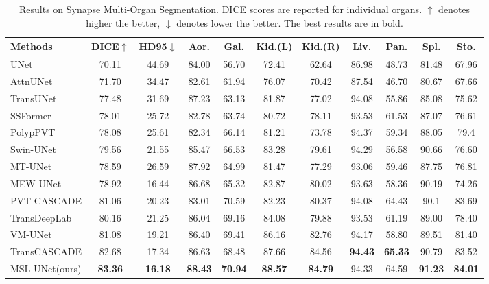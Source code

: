 \documentclass[10pt, a4paper, twocolumn]{article}
\begin{document}
\begin{table}
\small
\centering
\label{f1}
\begin{tabular}{l|cc|cccccccc}\hline
Methods & DICE$\uparrow$ & HD95$\downarrow$ &Aor.& Gal. &Kid.(L) &Kid.(R) &Liv. &Pan. &Spl. &Sto. \\\hline

UNet\cite{ronneberger2015unet} & 70.11& 44.69& 84.00 &56.70& 72.41& 62.64& 86.98& 48.73& 81.48& 67.96 \\
AttnUNet\cite{oktay2018attention}& 71.70& 34.47& 82.61& 61.94& 76.07& 70.42& 87.54& 46.70& 80.67& 67.66 \\
TransUNet\cite{chen2021transunet} & 77.48 &31.69& 87.23 &63.13 &81.87 &77.02 &94.08 &55.86& 85.08& 75.62	\\
SSFormer\cite{wang2022stepwise}& 78.01& 25.72&  82.78& 63.74& 80.72& 78.11& 93.53& 61.53& 87.07& 76.61 \\
PolypPVT\cite{dong2021polyp} & 78.08& 25.61&  82.34& 66.14& 81.21& 73.78& 94.37& 59.34& 88.05& 79.4 \\
Swin-UNet\cite{cao2021swinunet} & 79.56 & 21.55 & 85.47 &66.53 &83.28 &79.61& 94.29 &56.58& 90.66& 76.60	\\
MT-UNet\cite{wang2022mixed} & 78.59 &26.59& 87.92& 64.99& 81.47& 77.29& 93.06& 59.46& 87.75& 76.81\\
MEW-UNet\cite{ruan2022mew} & 78.92& 16.44& 86.68& 65.32& 82.87& 80.02& 93.63& 58.36& 90.19& 74.26\\
PVT-CASCADE\cite{rahman2023medical} & 81.06& 20.23& 83.01& 70.59& 82.23& 80.37& 94.08& 64.43& 90.1& 83.69 \\
TransDeepLab\cite{azad2022transdeeplab} & 80.16& 21.25& 86.04& 69.16& 84.08& 79.88& 93.53& 61.19& 89.00& 78.40\\
VM-UNet\cite{ruan2024vmunet} & 81.08& 19.21& 86.40& 69.41& 86.16& 82.76& 94.17& 58.80& 89.51& 81.40 \\
TransCASCADE\cite{rahman2023transcascade} & 82.68 &17.34 & 86.63 &68.48& 87.66& 84.56& \textbf{94.43}& \textbf{65.33}& 90.79& 83.52\\
\hline
MSL-UNet(ours) & \textbf{83.36}& \textbf{16.18}& \textbf{88.43}& \textbf{70.94}& \textbf{88.57}& \textbf{84.79}& 94.33& 64.59& \textbf{91.23}& \textbf{84.01} \\\hline
\end{tabular}
\caption{Results on Synapse Multi-Organ Segmentation. DICE scores are reported for individual organs. $\uparrow$ denotes higher the better, $\downarrow$ denotes lower the better. The best results are in bold.}
\end{table}
\end{document}
